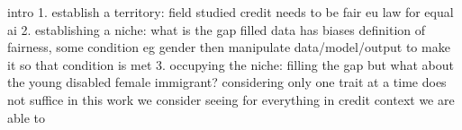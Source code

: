 \documentclass{article}
\begin{document}
        intro 
        1. establish a territory: field studied
credit needs to be fair 
eu law for equal ai
2. establishing a niche: what is the gap filled
data has biases
definition of fairness, some condition eg gender 
then manipulate data/model/output to make it so that condition is met 
3. occupying the niche: filling the gap
but what about the young disabled female immigrant?
considering only one trait at a time does not suffice
in this work we consider seeing for everything in credit context
we are able to 

\printbibliography
\end{document}
